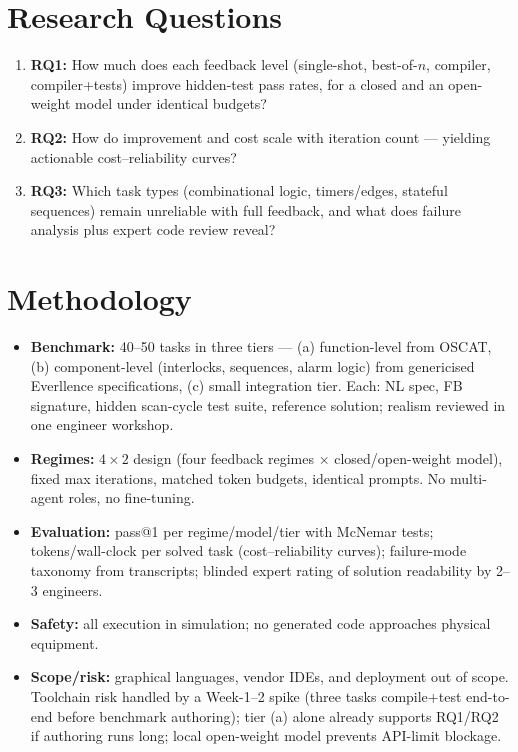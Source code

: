 \documentclass[10pt,a4paper]{article}
\begin{document}
\section{Research Questions}

\begin{enumerate}
    \item \textbf{RQ1:} How much does each feedback level (single-shot, best-of-$n$, compiler, compiler+tests) improve hidden-test pass rates, for a closed and an open-weight model under identical budgets?
    \item \textbf{RQ2:} How do improvement and cost scale with iteration count --- yielding actionable cost--reliability curves?
    \item \textbf{RQ3:} Which task types (combinational logic, timers/edges, stateful sequences) remain unreliable with full feedback, and what does failure analysis plus expert code review reveal?
\end{enumerate}

\section{Methodology}

\begin{itemize}
    \item \textbf{Benchmark:} 40--50 tasks in three tiers --- (a) function-level from OSCAT, (b) component-level (interlocks, sequences, alarm logic) from genericised Everllence specifications, (c) small integration tier. Each: NL spec, FB signature, hidden scan-cycle test suite, reference solution; realism reviewed in one engineer workshop.
    \item \textbf{Regimes:} $4\times2$ design (four feedback regimes $\times$ closed/open-weight model), fixed max iterations, matched token budgets, identical prompts. No multi-agent roles, no fine-tuning.
    \item \textbf{Evaluation:} pass@1 per regime/model/tier with McNemar tests; tokens/wall-clock per solved task (cost--reliability curves); failure-mode taxonomy from transcripts; blinded expert rating of solution readability by 2--3 engineers.
    \item \textbf{Safety:} all execution in simulation; no generated code approaches physical equipment.
    \item \textbf{Scope/risk:} graphical languages, vendor IDEs, and deployment out of scope. Toolchain risk handled by a Week-1--2 spike (three tasks compile+test end-to-end before benchmark authoring); tier (a) alone already supports RQ1/RQ2 if authoring runs long; local open-weight model prevents API-limit blockage.
\end{itemize}
\end{document}
